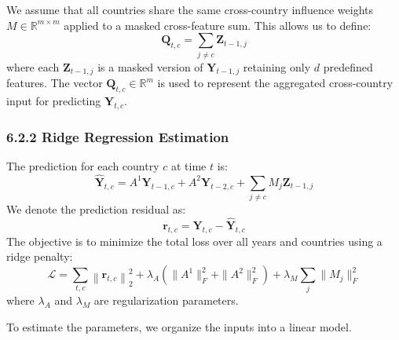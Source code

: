 \documentclass[12pt]{article}
\begin{document}
We assume that all countries share the same cross-country influence weights $M \in \mathbb{R}^{m \times m}$ applied to a masked cross-feature sum. This allows us to define:
\[
\mathbf{Q}_{t,c} = \sum_{j \ne c} \mathbf{Z}_{t-1,j}
\]
where each $\mathbf{Z}_{t-1,j}$ is a masked version of $\mathbf{Y}_{t-1,j}$ retaining only $d$ predefined features. The vector $\mathbf{Q}_{t,c} \in \mathbb{R}^m$ is used to represent the aggregated cross-country input for predicting $\mathbf{Y}_{t,c}$.


 \subsubsection*{6.2.2 Ridge Regression Estimation}

The prediction for each country $c$ at time $t$ is:
\[
\hat{\mathbf{Y}}_{t,c} = A^1 \mathbf{Y}_{t-1,c} + A^2 \mathbf{Y}_{t-2,c} + \sum_{j \ne c} M_j \mathbf{Z}_{t-1,j}
\]
We denote the prediction residual as:
\[
\mathbf{r}_{t,c} = \mathbf{Y}_{t,c} - \hat{\mathbf{Y}}_{t,c}
\]
The objective is to minimize the total loss over all years and countries using a ridge penalty:
\[
\mathcal{L} = \sum_{t,c} \left\| \mathbf{r}_{t,c} \right\|_2^2 + \lambda_A \left( \|A^1\|_F^2 + \|A^2\|_F^2 \right) + \lambda_M \sum_j \|M_j\|_F^2
\]
where $\lambda_A$ and $\lambda_M$ are regularization parameters.

To estimate the parameters, we organize the inputs into a linear model.
\end{document}
